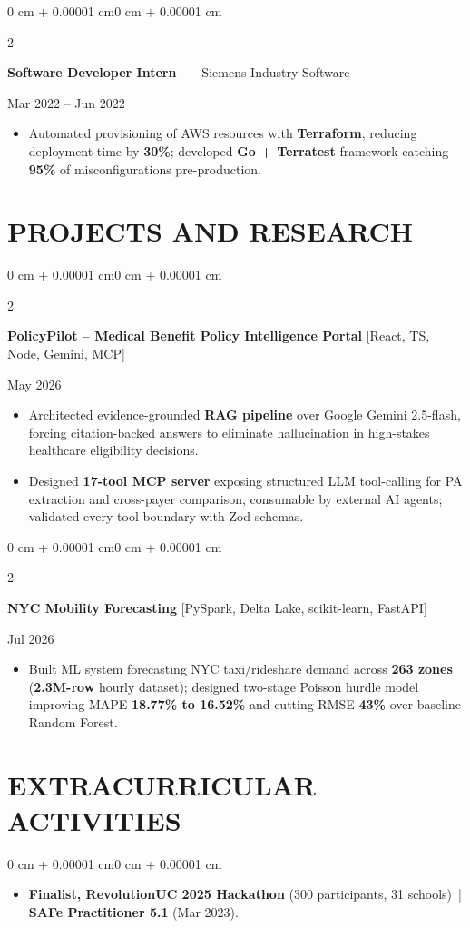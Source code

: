 \documentclass[10pt, letterpaper]{article}
\newenvironment{highlights}{
    \begin{itemize}[
        topsep=0.10 cm,
        parsep=0.06 cm,
        partopsep=0pt,
        itemsep=0.06 cm,
        leftmargin=12pt
    ]
}{
    \end{itemize}
}
\newenvironment{onecolentry}{
    \begin{adjustwidth}{0 cm + 0.00001 cm}{0 cm + 0.00001 cm}
}{
    \end{adjustwidth}
}
\newenvironment{twocolentry}[2][]{
    \onecolentry
    \def\secondColumn{#2}
    \setcolumnwidth{\fill, 4.5 cm}
    \begin{paracol}{2}
}{
    \switchcolumn \raggedleft \secondColumn
    \end{paracol}
    \endonecolentry
}
\begin{document}
\vspace{0.15 cm}

\begin{twocolentry}{Mar 2022 -- Jun 2022}
\textbf{Software Developer Intern} ---- Siemens Industry Software
\end{twocolentry}
\begin{highlights}
  \item Automated provisioning of AWS resources with \textbf{Terraform}, reducing deployment time by \textbf{30\%}; developed \textbf{Go + Terratest} framework catching \textbf{95\%} of misconfigurations pre-production.
\end{highlights}

\section{PROJECTS AND RESEARCH}
\begin{twocolentry}{May 2026}
\textbf{PolicyPilot -- Medical Benefit Policy Intelligence Portal} [React, TS, Node, Gemini, MCP]
\end{twocolentry}
\begin{highlights}
  \item Architected evidence-grounded \textbf{RAG pipeline} over Google Gemini 2.5-flash, forcing citation-backed answers to eliminate hallucination in high-stakes healthcare eligibility decisions.
  \item Designed \textbf{17-tool MCP server} exposing structured LLM tool-calling for PA extraction and cross-payer comparison, consumable by external AI agents; validated every tool boundary with Zod schemas.
\end{highlights}

\vspace{0.12 cm}

\begin{twocolentry}{Jul 2026}
\textbf{NYC Mobility Forecasting} [PySpark, Delta Lake, scikit-learn, FastAPI]
\end{twocolentry}
\begin{highlights}
  \item Built ML system forecasting NYC taxi/rideshare demand across \textbf{263 zones} (\textbf{2.3M-row} hourly dataset); designed two-stage Poisson hurdle model improving MAPE \textbf{18.77\% to 16.52\%} and cutting RMSE \textbf{43\%} over baseline Random Forest.
\end{highlights}

\section{EXTRACURRICULAR ACTIVITIES}
\begin{onecolentry}
\begin{highlights}
  \item \textbf{Finalist, RevolutionUC 2025 Hackathon} (300 participants, 31 schools) \,|\, \textbf{SAFe Practitioner 5.1} (Mar 2023).
\end{highlights}
\end{onecolentry}
\end{document}
